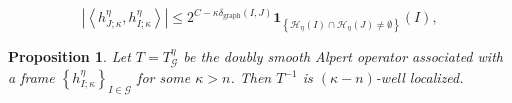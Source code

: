 \documentclass[10pt,a4paper]{amsart}
\newtheorem{proposition}{Proposition}
\begin{document}
\begin{equation}
\left\vert \left\langle h_{J;\kappa}^{\eta},h_{I;\kappa}^{\eta}\right\rangle
\right\vert \leq2^{C-\kappa\delta_{\operatorname*{graph}}\left(  I,J\right)
}\mathbf{1}_{\left\{  \mathcal{H}_{\eta}\left(  I\right)  \cap\mathcal{H}%
_{\eta}\left(  J\right)  \neq\emptyset\right\}  }\left(  I\right)
,\label{where'}%
\end{equation}

\begin{proposition}
\label{T inv well}Let $T=T_{\mathcal{G}}^{\eta}$ be the doubly smooth Alpert
operator associated with a frame $\left\{  h_{I;\kappa}^{\eta}\right\}
_{I\in\mathcal{G}}$ for some $\kappa>n$. Then $T^{-1}$ is $\left(
\kappa-n\right)  $-well localized.
\end{proposition}
\end{document}
